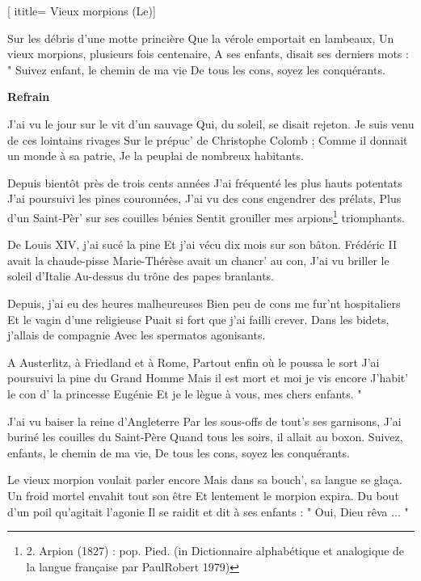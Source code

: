  [
ititle= {Vieux morpions (Le)}]


\beginverse
Sur les débris d'une motte princière
Que la vérole emportait en lambeaux,
Un vieux morpions, plusieurs fois centenaire,
A ses enfants, disait ses derniers mots :
" Suivez enfant, le chemin de ma vie
De tous les cons, soyez les conquérants.
\endverse

\beginchorus
\textbf {Refrain}
\endchorus

\beginverse
J'ai vu le jour sur le vit d'un sauvage
Qui, du soleil, se disait rejeton.
Je suis venu de ces lointains rivages
Sur le prépuc' de Christophe Colomb ;
Comme il donnait un monde à sa patrie,
Je la peuplai de nombreux habitants.
\endverse

\beginverse
Depuis bientôt près de trois cents années
J'ai fréquenté les plus hauts potentats
J'ai poursuivi les pines couronnées,
J'ai vu des cons engendrer des prélats,
Plus d'un Saint-Pèr' sur ses couilles bénies
Sentit grouiller mes arpions\footnote{2. Arpion (1827) : pop. Pied. (in Dictionnaire alphabétique et analogique de la langue française par PaulRobert 1979)} triomphants.
\endverse

\beginverse
De Louis XIV, j'ai sucé la pine
Et j'ai vécu dix mois sur son bâton.
Frédéric II avait la chaude-pisse
Marie-Thérèse avait un chancr' au con,
J'ai vu briller le soleil d'Italie
Au-dessus du trône des papes branlants.
\endverse

\beginverse
Depuis, j'ai eu des heures malheureuses
Bien peu de cons me fur'nt hospitaliers
Et le vagin d'une religieuse
Puait si fort que j'ai failli crever.
Dans les bidets, j'allais de compagnie
Avec les spermatos agonisants.
\endverse

\beginverse
A Austerlitz, à Friedland et à Rome,
Partout enfin où le poussa le sort
J'ai poursuivi la pine du Grand Homme
Mais il est mort et moi je vis encore
J'habit' le con d' la princesse Eugénie
Et je le lègue à vous, mes chers enfants. "
\endverse

\beginverse
J'ai vu baiser la reine d'Angleterre
Par les sous-offs de tout's ses garnisons,
J'ai buriné les couilles du Saint-Père
Quand tous les soirs, il allait au boxon.
Suivez, enfants, le chemin de ma vie,
De tous les cons, soyez les conquérants.
\endverse

\beginverse
Le vieux morpion voulait parler encore
Mais dans sa bouch', sa langue se glaça.
Un froid mortel envahit tout son être
Et lentement le morpion expira.
Du bout d'un poil qu'agitait l'agonie
Il se raidit et dit à ses enfants :
" Oui, Dieu rêva ... "
\endverse

\endsong